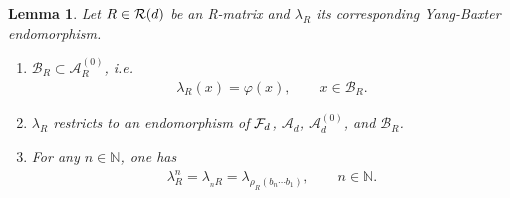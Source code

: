 \documentclass[12pt,a4paper]{amsart}
\numberwithin{equation}{section}
\newtheorem{lemma}[theorem]{Lemma}
\theoremstyle{remark}
\newcommand{\Nl}{\mathbb{N}}
\newcommand{\la}{\lambda}
\newcommand{\CA}[0]{\mathcal{A}} \newcommand{\CB}[0]{\mathcal{B}}
\begin{document}
\begin{lemma}\label{lemma:YBEndos}
    Let $R \in \mathcal{R}(d)$ be an R-matrix and $\la_R$ its corresponding Yang-Baxter endomorphism.
    \begin{enumerate}
        \item\label{item:ARinclusions} $\CB_R\subset\CA_R^{(0)}$, i.e. 
        \begin{align}\label{eq:lambdaRrestrictstovarphionB}
         \la_R(x)=\varphi(x),\qquad x\in\CB_R.
        \end{align}
        \item\label{item:lambdaRrestrictstovarphi} $\la_R$ restricts to an endomorphism of $\mathcal{F}_d$, $\CA_d$, $\CA_d^{(0)}$, and $\CB_R$.
        \item\label{item:PowersofLaR} For any $n\in\Nl$, one has
        \begin{align}\label{eq:PowersOfLaR}
        \lambda_R^n 
        = 
        \lambda_{{}_nR}
        =
        \lambda_{\rho_R(b_n\cdots b_1)},\qquad n\in\Nl.
    \end{align}
    \end{enumerate}
\end{lemma}
\end{document}
